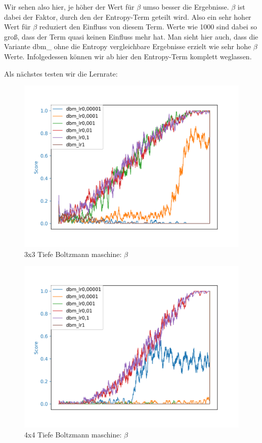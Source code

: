 Wir sehen also hier, je höher der Wert für $\beta$ umso besser die Ergebnisse. $\beta$ ist dabei der Faktor, durch den der Entropy-Term geteilt wird. Also ein sehr hoher Wert für $\beta$ reduziert den Einfluss von diesem Term. Werte wie 1000 sind dabei so groß, dass der Term quasi keinen Einfluss mehr hat. Man sieht hier auch, dass die Variante dbm\_ ohne die Entropy vergleichbare Ergebnisse erzielt wie sehr hohe $\beta$ Werte. Infolgedessen können wir ab hier den Entropy-Term komplett weglassen.

Als nächstes testen wir die Lernrate:

\begin{figure}[H]
\centering
\includegraphics[width=\textwidth]{Figures/dbm6_3x3_dbm_lr0,00001_dbm_lr0,0001_dbm_lr0,001_dbm_lr0,01_dbm_lr0,1_dbm_lr1.png}
\caption{3x3 Tiefe Boltzmann maschine: $\beta$}
\label{dbm1}
\end{figure}

\begin{figure}[H]
\centering
\includegraphics[width=\textwidth]{Figures/dbm7_4x4_dbm_lr0,00001_dbm_lr0,0001_dbm_lr0,001_dbm_lr0,01_dbm_lr0,1_dbm_lr1.png}
\caption{4x4 Tiefe Boltzmann maschine: $\beta$}
\label{dbm1}
\end{figure}

